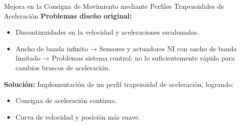 \documentclass[12pt]{beamer}
\begin{document}
\begin{frame}{\small Mejora en la Consigna de Movimiento mediante Perfiles Trapezoidales de Aceleración}
    \textbf{Problemas diseño original:}  
    \begin{itemize}
        \item Discontinuidades en la velocidad y aceleraciones escalonadas.
        \item Ancho de banda infinito → Sensores y actuadores NI con ancho de banda limitado → Problemas sistema control: no lo suficientemente rápido para cambios bruscos de aceleración.
    \end{itemize}
    
    \textbf{Solución:} Implementación de un perfil trapezoidal de aceleración, logrando:
    \begin{itemize}
        \item Consigna de aceleración continua.
        \item Curva de velocidad y posición más suave.
    \end{itemize}
\end{frame}
\end{document}
